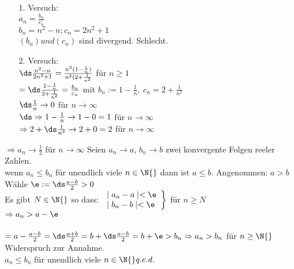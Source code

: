 \begin{itemize}
\item[1.]{Versuch:\\
$a_n = \frac{b_n}{c_n}$\\[4pt]
$b_n = n^2 -n; c_n = 2n^2 + 1$\\
$(b_n) und (c_n)$ sind divergend. Schlecht.}
\item[2.]{Versuch:\\
$\ds\frac{n^2 - n}{2n^2 + 1} = \frac{n^2(1 - \frac{1}{n})}{n^2(2 + \frac{1}{n^2}}$ für $n \geq 1$\\[4pt]
$= \ds\frac{1-\frac{1}{n}}{2 +\frac{1}{n^2}}=\frac{b_n}{c_n}$ mit $b_n:=1-\frac{1}{n},\ c_n = 2 + \frac{1}{n^2}$\\[4pt]
$\ds\frac{1}{n} \to 0$ für $n \to \infty $\\[4pt]
$\ds\Rightarrow 1 - \frac{1}{n} \to 1 - 0 = 1$ für $n \to \infty$\\[4pt]
$\Rightarrow 2 + \ds\frac{1}{n^2} \to 2 + 0 = 2$ für $n \to \infty$}
\end{itemize}
%
$\Rightarrow a_n \to \frac{1}{2}$ für $n \to \infty$
%
Seien $a_n \to a$, $b_n \to b$ zwei konvergente Folgen reeler Zahlen.\\
wenn $a_n \leq b_n$ für unendlich viele $n \in \N{}$ dann ist $a \leq b$.
\bew
Angenommen: $a > b$\\

Wähle $\e := \ds\frac{a - b}{2} > 0$\\
Es gibt $N \in \N{}$ so dass:
$
\left.
\begin{array}{ll}
\mid a_n - a \mid  < \e \\
\mid b_n - b \mid  < \e
\end{array} \right\rbrace$ für $n \geq N$\\
$\Rightarrow a_n > a - \e$\\ \\
$= a - \frac{a - b}{2} = \ds\frac{a + b}{2} = b + \ds\frac{a - b}{2}\\
\\
= b + \e > b_n \Rightarrow a_n > b_n$ für $n \geq \N{}$\\
Widerspruch zur Annahme.\\
$a_n \leq b_n$ für unendlich viele $n \in \N{} \hfill q.e.d.$

